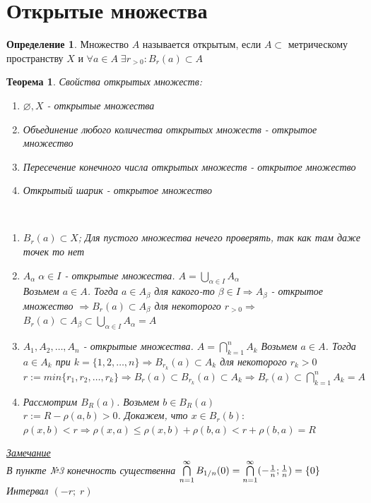 \documentclass[12pt,letterpaper]{report}
\makeatletter
\newtheorem*{theorem-non}{Теорема}
\theoremstyle{definition}
\newtheorem*{conj}{Определение}
\newcommand{\notice}{\underline{\textit{Замечание }}}
\renewenvironment{proof}[1][\proofname]{%
   \par\pushQED{\qed}\normalfont%
   \topsep6\p@\@plus6\p@\relax
   \trivlist\item[\hskip\labelsep\bfseries#1\@addpunct{.}]%
   \ignorespaces
}{%
   \popQED\endtrivlist\@endpefalse
}
\makeatother
\begin{document}
\section{Открытые множества}
\begin{conj}
    Множество $A$ называется открытым, если $A \subset $ метрическому пространству $X$ и $\forall a \in A \; \exists r_{>0} : B_r(a) \subset A$
\end{conj}
\begin{theorem-non}
    Свойства открытых множеств:
    \begin{enumerate}
        \item $\varnothing, X$ - открытые множества 
        \item Объединение любого количества открытых множеств - открытое множество
        \item Пересечение конечного числа открытых множеств - открытое множество
        \item Открытый шарик - открытое множество
    \end{enumerate}
    \begin{proof}
        \quad \\
        \begin{enumerate}
            \item $B_r(a) \subset X$; Для пустого множества нечего проверять, так как там даже точек то нет
            \item $A_{\alpha} \; \alpha \in I$ - открытые множества. $A = \bigcup\limits_{\alpha \in I} A_{\alpha}$ \\
            Возьмем $a \in A$. Тогда $a \in A_{\beta}$ для какого-то $\beta \in I \Longrightarrow A_{\beta}$ - открытое множество 
            $\Longrightarrow B_r(a) \subset A_{\beta}$ для некоторого $r_{>0} \Longrightarrow$ \\
            $B_r(a) \subset A_{\beta} \subset \bigcup\limits_{\alpha \in I} A_{\alpha} = A$
            \item $A_1, A_2, \dots , A_n$ - открытые множества. $A = \bigcap\limits_{k = 1}^{n} A_k$
            Возьмем $a \in A$. Тогда $a \in A_k$ при $k = \{1, 2, \dots , n\} \Longrightarrow
            B_{r_k}(a) \subset A_k$ для некоторого $r_k > 0$ \\
            $r := min\{r_1, r_2, \dots , r_k\} \Longrightarrow B_r(a) \subset B_{r_k}(a) \subset A_k 
            \Longrightarrow B_r(a) \subset \bigcap\limits_{k=1}^n A_k = A$
            \item Рассмотрим $B_R(a)$. Возьмем $b \in B_R(a)$ \\
            $r := R-\rho(a, b) > 0$.
            Докажем, что $x \in B_r(b):$ \\
            $\rho(x, b) < r \Longrightarrow \rho(x,a) \leqslant \rho(x, b) + \rho(b,a) < r + \rho(b,a) = R$
        \end{enumerate}
    \end{proof}
    \notice \\
    В пункте №3 конечность существенна
    $\bigcap\limits_{n=1}^{\infty} B_{1/n}(0) = \bigcap\limits_{n=1}^{\infty}(-{{1}\over{n}}; {{1}\over{n}}) = \{0\}$ Интервал $(-r; \; r)$
\end{theorem-non}
\end{document}
